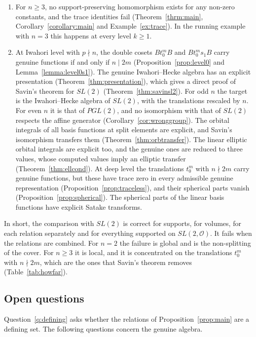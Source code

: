\documentclass[12pt,letterpaper]{amsart}
\numberwithin{equation}{section}
\theoremstyle{definition}
\theoremstyle{remark}
\newcommand{\cO}{\mathcal{O}}
\begin{document}
\begin{enumerate}[leftmargin=2em]
isomorphism when the lifts can be chosen multiplicatively, and not
otherwise if two commuting elements have non-commuting lifts
(Proposition~\ref{prop:monoid}). On $\bigcup_{m\geq0}Bt_0^mB$ this
holds for $n=2$ and fails for $n\geq3$ (Example~\ref{ex:monoid}).
\item For $n\geq 3$, no support-preserving homomorphism exists for any
non-zero constants, and the trace identities fail
(Theorem~\ref{thrm:main}, Corollary~\ref{corollary:main} and
Example~\ref{ex:trace}). In the running example with $n=3$ this
happens at every level $k\geq 1$.
\item At Iwahori level with $p\nmid n$, the double cosets $Bt_0^mB$
and $Bt_0^ms_1B$ carry genuine functions if and only if $n\mid 2m$
(Proposition~\ref{prop:level0} and Lemma~\ref{lemma:level0s1}). The
genuine Iwahori--Hecke algebra has an explicit presentation
(Theorem~\ref{thm:presentation}), which gives a direct proof of
Savin's theorem for $SL(2)$ (Theorem~\ref{thm:savinsl2}). For odd $n$
the target is the Iwahori--Hecke algebra of $SL(2)$, with the
translations rescaled by $n$. For even $n$ it is that of $PGL(2)$, and
no isomorphism with that of $SL(2)$ respects the affine generator
(Corollary~\ref{cor:wronggroup}). The orbital integrals of all basis
functions at split elements are explicit, and Savin's isomorphism
transfers them (Theorem~\ref{thm:orbtransfer}). The linear elliptic
orbital integrals are explicit too, and the genuine ones are reduced to
three values, whose computed values imply an elliptic transfer
(Theorem~\ref{thm:ellcond}). At deep
level the translations $t_0^m$ with $n\nmid 2m$ carry genuine
functions, but these have trace zero in every admissible genuine representation
(Proposition~\ref{prop:traceless}), and their spherical parts vanish
(Proposition~\ref{prop:spherical}). The spherical parts of the linear
basis functions have explicit Satake transforms.
\end{enumerate}

\noindent
In short, the comparison with $SL(2)$ is correct for supports, for
volumes, for each relation separately and for everything supported on
$SL(2,\cO)$. It fails when the relations are combined. For $n=2$ the
failure is global and is the non-splitting of the cover. For $n\geq 3$
it is local, and it is concentrated on the translations $t_0^m$ with
$n\nmid 2m$, which are the ones that Savin's theorem removes
(Table~\ref{tab:howfar}).

\subsection*{Open questions}
Question~\ref{q:defining} asks whether the relations of
Proposition~\ref{prop:main} are a defining set. The following questions
concern the genuine algebra.
\end{document}

